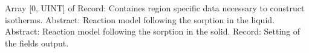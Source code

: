 \begin{RecordType}
			{{Array [0, UINT] of }{Record}{: }}
			{\textrangle}
			{} %
			{{{Containes region specific data necessary to construct isotherms.}}}
		\KeyItem
			{}
			{{Abstract}{: }}
			{\textrangle}
			{} %
			{{{Reaction model following the sorption in the liquid.}}}
		\KeyItem
			{}
			{{Abstract}{: }}
			{\textrangle}
			{} %
			{{{Reaction model following the sorption in the solid.}}}
		\KeyItem
			{}
			{{Record}{: }}
			{\textrangle}
			{} %
			{{{Setting of the fields output.}}}
\end{RecordType}
